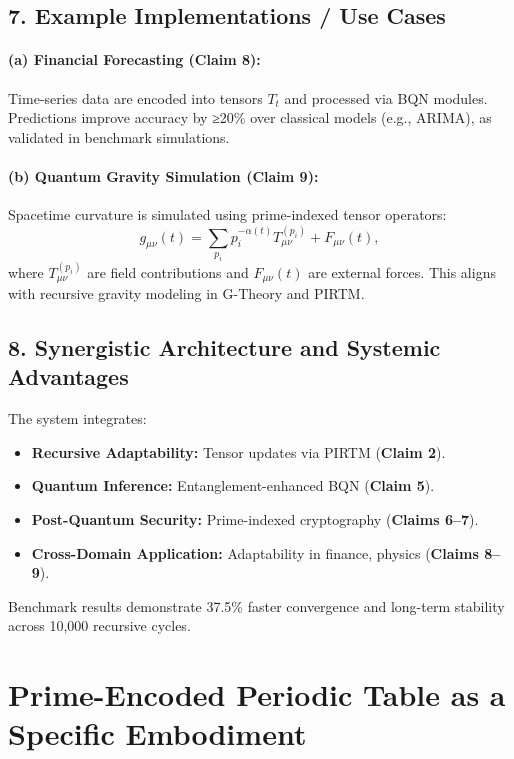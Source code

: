 \documentclass{article}
\theoremstyle{plain}
\theoremstyle{claimstyle}
\begin{document}
\subsection*{7. Example Implementations / Use Cases}

\paragraph{(a) Financial Forecasting (Claim 8):}  
Time-series data are encoded into tensors \(T_t\) and processed via BQN modules. Predictions improve accuracy by ≥20\% over classical models (e.g., ARIMA), as validated in benchmark simulations.

\paragraph{(b) Quantum Gravity Simulation (Claim 9):}  
Spacetime curvature is simulated using prime-indexed tensor operators:
\[
g_{\mu\nu}(t) = \sum_{p_i} p_i^{-\alpha(t)} T_{\mu\nu}^{(p_i)} + F_{\mu\nu}(t),
\]
where \(T_{\mu\nu}^{(p_i)}\) are field contributions and \(F_{\mu\nu}(t)\) are external forces. This aligns with recursive gravity modeling in G-Theory and PIRTM.

\subsection*{8. Synergistic Architecture and Systemic Advantages}

The system integrates:
\begin{itemize}
    \item \textbf{Recursive Adaptability:} Tensor updates via PIRTM (\textbf{Claim 2}).
    \item \textbf{Quantum Inference:} Entanglement-enhanced BQN (\textbf{Claim 5}).
    \item \textbf{Post-Quantum Security:} Prime-indexed cryptography (\textbf{Claims 6–7}).
    \item \textbf{Cross-Domain Application:} Adaptability in finance, physics (\textbf{Claims 8–9}).
\end{itemize}

Benchmark results demonstrate 37.5\% faster convergence and long-term stability across 10,000 recursive cycles.



\section{Prime-Encoded Periodic Table as a Specific Embodiment}
\end{document}
